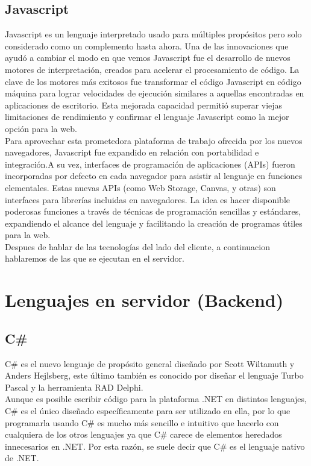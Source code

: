 \subsection{Javascript}

Javascript es un lenguaje interpretado usado para m\'ultiples prop\'ositos pero solo considerado como un complemento hasta ahora. Una de las innovaciones que ayud\'o a cambiar el modo en que vemos Javascript fue el desarrollo de nuevos motores de interpretaci\'on, creados para acelerar el procesamiento de c\'odigo. La clave de los motores m\'as exitosos fue transformar el c\'odigo Javascript en c\'odigo m\'aquina para lograr velocidades de ejecuci\'on similares a aquellas encontradas en aplicaciones de escritorio. Esta mejorada capacidad permiti\'o superar viejas limitaciones de rendimiento y confirmar el lenguaje Javascript como la mejor opci\'on para la web.\\

Para aprovechar esta prometedora plataforma de trabajo ofrecida por los nuevos navegadores, Javascript fue expandido en relaci\'on con portabilidad e integraci\'on.A su vez, interfaces de programaci\'on de aplicaciones (APIs) fueron incorporadas por defecto en cada navegador para asistir al lenguaje en funciones elementales. Estas nuevas APIs (como Web Storage, Canvas, y otras) son interfaces para librer\'ias incluidas en navegadores. La idea es hacer disponible poderosas funciones a trav\'es de t\'ecnicas de programaci\'on sencillas y est\'andares, expandiendo el alcance del lenguaje y facilitando la creaci\'on de programas \'utiles para la web.\\


Despues de hablar de las tecnolog\'ias del lado del cliente, a continuacion hablaremos de las que se ejecutan en el servidor.

\section{Lenguajes en servidor (Backend)}
\subsection{C\#}

C\# es el nuevo lenguaje de prop\'osito general dise\~nado por Scott Wiltamuth y Anders Hejlsberg, este \'ultimo tambi\'en es conocido por dise\~nar el lenguaje Turbo Pascal y la herramienta RAD Delphi.\\

Aunque es posible escribir c\'odigo para la plataforma .NET en distintos lenguajes, C\# es el \'unico dise\~nado espec\'ificamente para ser utilizado en ella, por lo que programarla usando C\# es mucho m\'as sencillo e intuitivo que hacerlo con cualquiera de los otros lenguajes ya que C\# carece de elementos heredados innecesarios en .NET. Por esta raz\'on, se suele decir que C\# es el lenguaje nativo de .NET.\\

